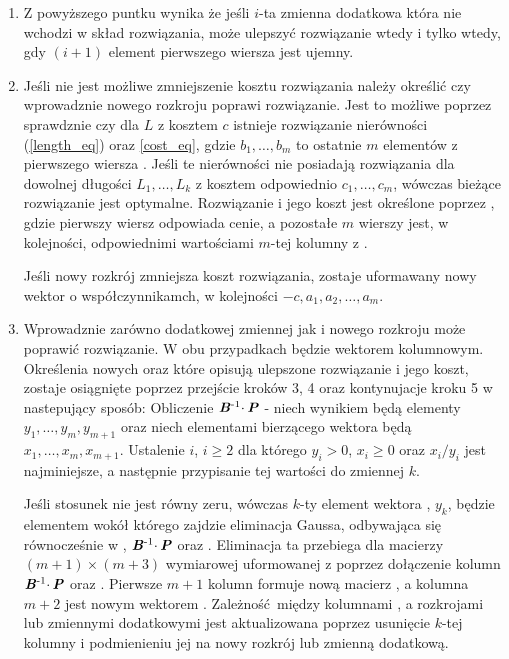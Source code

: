 \begin{enumerate}
\item Z powyższego puntku wynika że jeśli $i$-ta zmienna dodatkowa która nie wchodzi w skład rozwiązania, może ulepszyć rozwiązanie wtedy i tylko wtedy, gdy $(i+1)$ element pierwszego wiersza  jest ujemny.

\item Jeśli nie jest możliwe zmniejszenie kosztu rozwiązania należy określić czy wprowadznie nowego rozkroju poprawi rozwiązanie. Jest to możliwe poprzez sprawdznie czy dla $L$ z kosztem $c$ istnieje rozwiązanie nierówności (\ref{length_eq}) oraz \ref{cost_eq}, gdzie $b_1,\dots,b_m$ to ostatnie $m$ elementów z pierwszego wiersza . Jeśli te nierówności nie posiadają rozwiązania dla dowolnej długości $L_1,\dots,L_k$ z kosztem odpowiednio $c_1,\dots,c_m$, wówczas bieżące rozwiązanie jest optymalne. Rozwiązanie i jego koszt jest określone poprzez , gdzie pierwszy wiersz odpowiada cenie, a pozostałe $m$ wierszy jest, w kolejności, odpowiednimi wartościami $m$-tej kolumny z .

Jeśli nowy rozkrój zmniejsza koszt rozwiązania, zostaje uformawany nowy wektor  o współczynnikamch, w kolejności $-c,a_1,a_2,\dots,a_m$.

\item Wprowadznie zarówno dodatkowej zmiennej jak i nowego rozkroju może poprawić rozwiązanie. W obu przypadkach  będzie wektorem kolumnowym. Określenia nowych  oraz  które opisują ulepszone rozwiązanie i jego koszt, zostaje osiągnięte poprzez przejście kroków 3, 4 oraz kontynujacje kroku 5 w nastepujący sposób: Obliczenie $\textbf{\textit{B}}\textsuperscript{-1} \cdotp \textbf{\textit{P}}$ - niech wynikiem będą elementy $y_1,\dots,y_m,y_{m+1}$ oraz niech elementami bierzącego wektora  będą $x_1,\dots,x_m,x_{m+1}$. Ustalenie $i$, $ i \ge 2$ dla którego $y_i > 0$, $x_i \ge 0$ oraz $x_i/y_i$ jest najminiejsze, a następnie przypisanie tej wartości do zmiennej $k$.

Jeśli stosunek nie jest równy zeru, wówczas $k$-ty element wektora , $y_k$, będzie elementem wokół którego zajdzie eliminacja Gaussa, odbywająca się równocześnie w , $\textbf{\textit{B}}\textsuperscript{-1} \cdotp \textbf{\textit{P}}$ oraz . Eliminacja ta przebiega dla macierzy $(m+1) \times (m+3)$ wymiarowej  uformowanej z  poprzez dołączenie kolumn $\textbf{\textit{B}}\textsuperscript{-1} \cdotp \textbf{\textit{P}}$ oraz . Pierwsze $m+1$ kolumn  formuje nową macierz , a kolumna $m+2$ jest nowym wektorem . Zależność między kolumnami , a rozkrojami lub zmiennymi dodatkowymi jest aktualizowana poprzez usunięcie $k$-tej kolumny i podmienieniu jej na nowy rozkrój lub zmienną dodatkową.

\end{enumerate}

